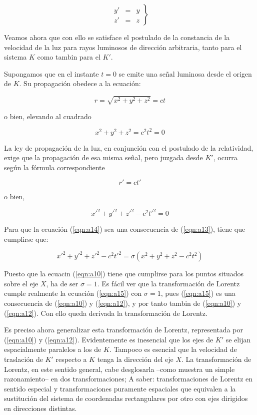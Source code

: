 \documentclass[spanish]{book}
\begin{document}
\begin{equation}
\left.\begin{array}{rcl}
y' & = & y\\
z' & = & z\end{array}\right\} \label{eqn:a12}
\end{equation}

Veamos ahora que con ello se satisface el postulado de la constancia de la velocidad
de la luz para rayos luminosos de dirección arbitraria, tanto para el sistema $K$ como
tambin para el $K'$.

Supongamos que en el instante $t=0$ se emite una señal luminosa desde el origen
de $K$. Su propagación obedece a la ecuación:

\[r=\sqrt{x^{2}+y^{2}+z^{2}}=ct\]

\noindent o bien, elevando al cuadrado

\begin{equation}
x^{2}+y^{2}+z^{2}=c^{2}t^{2}=0\label{eqn:a13}
\end{equation}

La ley de propagación de la luz, en conjunción con el postulado de la relatividad, exige
que la propagación de esa misma señal, pero juzgada desde $K'$, ocurra según la
fórmula correspondiente

\[r'=ct'\]

\noindent o bien,

\begin{equation}
x'^{2}+y'^{2}+z'^{2}-c^{2}t'^{2}=0\label{eqn:a14}
\end{equation}

Para que la ecuación (\ref{eqn:a14}) sea una consecuencia de (\ref{eqn:a13}), tiene que cumplirse que:

\begin{equation}
x'^{2}+y'^{2}+z'^{2}-c^{2}t'^{2}=\sigma(x^{2}+y^{2}+z^{2}-c^{2}t^{2})\label{eqn:a15}
\end{equation}

Puesto que la ecuacin (\ref{eqn:a10}) tiene que cumplirse para los puntos situados sobre el eje $X$,
ha de ser $\sigma=1$. Es fácil ver que la transformación de Lorentz cumple realmente la
ecuación (\ref{eqn:a15}) con $\sigma=1$, pues (\ref{eqn:a15}) es una consecuencia de (\ref{eqn:a10}) y (\ref{eqn:a12}), y por tanto tambin de (\ref{eqn:a10}) y (\ref{eqn:a12}). Con ello queda derivada la transformación de Lorentz.

Es preciso ahora generalizar esta transformación de Lorentz, representada por (\ref{eqn:a10}) y (\ref{eqn:a12}).
Evidentemente es inesencial que los ejes de $K'$ se elijan espacialmente paralelos a los de
$K$. Tampoco es esencial que la velocidad de traslación de $K'$ respecto a $K$ tenga la dirección
del eje $X$. La transformación de Lorentz, en este sentido general, cabe desglosarla
--como muestra un simple razonamiento-- en dos transformaciones; A saber:
transformaciones de Lorentz en sentido especial y transformaciones puramente
espaciales que equivalen a la sustitución del sistema de coordenadas rectangulares por
otro con ejes dirigidos en direcciones distintas.
\end{document}
